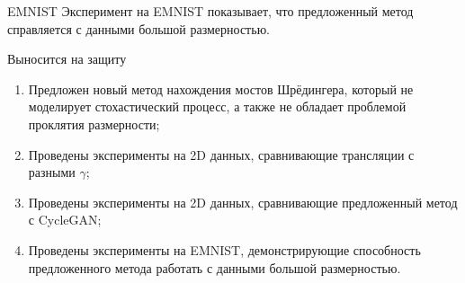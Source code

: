 \documentclass{beamer}
\begin{document}
\begin{frame}{EMNIST}
    Эксперимент на EMNIST показывает, что предложенный метод справляется с данными большой размерностью.
    \begin{figure}
        \centering
        \hfill
    \end{figure}
\end{frame}
\begin{frame}{Выносится на защиту}
    \begin{enumerate}
        \item Предложен новый метод нахождения мостов Шрёдингера, который не моделирует стохастический процесс, а также не обладает проблемой проклятия размерности;
        \item Проведены эксперименты на 2D данных, сравнивающие трансляции с разными $\gamma$;
        \item Проведены эксперименты на 2D данных, сравнивающие предложенный метод с CycleGAN;
        \item Проведены эксперименты на EMNIST, демонстрирующие способность предложенного метода работать с данными большой размерностью.
    \end{enumerate}
\end{frame}
\end{document}
